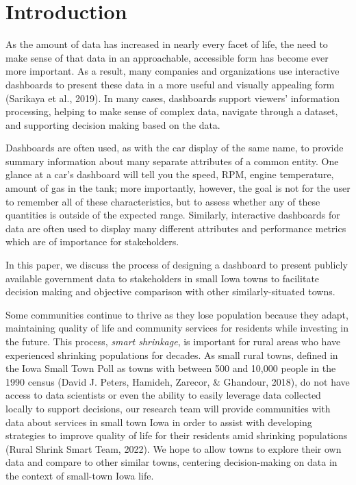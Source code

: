 \documentclass[print]{nuthesis}
\begin{document}
\hypertarget{introduction-2}{%
\section{Introduction}\label{introduction-2}}

As the amount of data has increased in nearly every facet of life, the need to make sense of that data in an approachable, accessible form has become ever more important.
As a result, many companies and organizations use interactive dashboards to present these data in a more useful and visually appealing form (Sarikaya et al., 2019).
In many cases, dashboards support viewers' information processing, helping to make sense of complex data, navigate through a dataset, and supporting decision making based on the data.

Dashboards are often used, as with the car display of the same name, to provide summary information about many separate attributes of a common entity. One glance at a car's dashboard will tell you the speed, RPM, engine temperature, amount of gas in the tank; more importantly, however, the goal is not for the user to remember all of these characteristics, but to assess whether any of these quantities is outside of the expected range.
Similarly, interactive dashboards for data are often used to display many different attributes and performance metrics which are of importance for stakeholders.

In this paper, we discuss the process of designing a dashboard to present publicly available government data to stakeholders in small Iowa towns to facilitate decision making and objective comparison with other similarly-situated towns.

Some communities continue to thrive as they lose population because they adapt, maintaining quality of life and community services for residents while investing in the future. This process, \emph{smart shrinkage}, is important for rural areas who have experienced shrinking populations for decades. As small rural towns, defined in the Iowa Small Town Poll as towns with between 500 and 10,000 people in the 1990 census (David J. Peters, Hamideh, Zarecor, \& Ghandour, 2018), do not have access to data scientists or even the ability to easily leverage data collected locally to support decisions, our research team will provide communities with data about services in small town Iowa in order to assist with developing strategies to improve quality of life for their residents amid shrinking populations (Rural Shrink Smart Team, 2022). We hope to allow towns to explore their own data and compare to other similar towns, centering decision-making on data in the context of small-town Iowa life.
\end{document}
